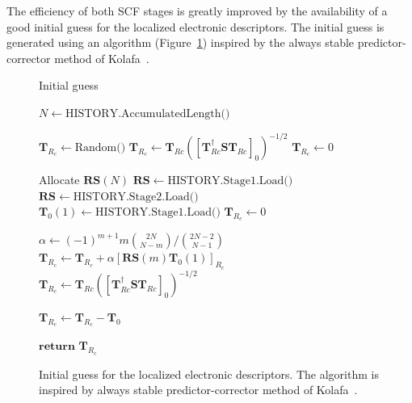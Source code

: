 \documentclass[aip,jcp,reprint,amsmath,amssymb]{revtex4-1}
\begin{document}
The efficiency of both SCF stages is greatly improved by the availability of a good initial guess for the localized electronic descriptors. The initial guess is generated using an algorithm (Figure~\ref{fig:guess}) inspired by the always stable predictor-corrector method of Kolafa~\cite{Kolafa2003}.

\begin{figure}
\begin{algorithm}[H]
  \caption{Initial guess}
  \label{alg:guess}
   \begin{algorithmic}[1]

	\State $N \gets \text{HISTORY.AccumulatedLength()}$ 

	 

			\State $\mathbf{T}_{R_c} \gets \text{Random()}$ %
			\State $\mathbf{T}_{R_c} \gets \mathbf{T}_{Rc} ([\mathbf{T}_{Rc}^{\dagger}\mathbf{S}\mathbf{T}_{Rc}]_0)^{-1/2}$ 
		\Else
			\State $\mathbf{T}_{R_c} \gets 0 $
		\EndIf

	\Else {}
	
		\State Allocate $\mathbf{RS}(N)$ 	
			\State $\mathbf{RS} \gets \text{HISTORY.Stage1.Load()}$ %
		\Else
			\State $\mathbf{RS} \gets \text{HISTORY.Stage2.Load()}$ %
		\EndIf
		\State $\mathbf{T}_{0}(1) \gets \text{HISTORY.Stage1.Load()}$ 
		\State $\mathbf{T}_{R_c} \gets 0$
		
			\State $\alpha \gets (-1)^{m+1} m \binom{2N}{ N-m} / \binom{2N-2}{N-1}$ 
			\State $\mathbf{T}_{R_c} \gets \mathbf{T}_{R_c} + \alpha [\mathbf{RS}(m) \mathbf{T}_{0}(1)]_{R_c} $ 
		\EndFor
		\State $\mathbf{T}_{R_c} \gets \mathbf{T}_{Rc} ([\mathbf{T}_{Rc}^{\dagger}\mathbf{S}\mathbf{T}_{Rc}]_0)^{-1/2}$ 
		
			\State $\mathbf{T}_{R_c} \gets \mathbf{T}_{R_c}  - \mathbf{T}_{0}$
		\EndIf

	\EndIf

	\State $\mathbf{return}$ $\mathbf{T}_{R_c}$
	\EndProcedure
   \end{algorithmic}
\end{algorithm}
\caption{\label{fig:guess} Initial guess for the localized electronic descriptors. The algorithm is inspired by always stable predictor-corrector method of Kolafa~\cite{Kolafa2003}.}
\end{figure}
\end{document}
